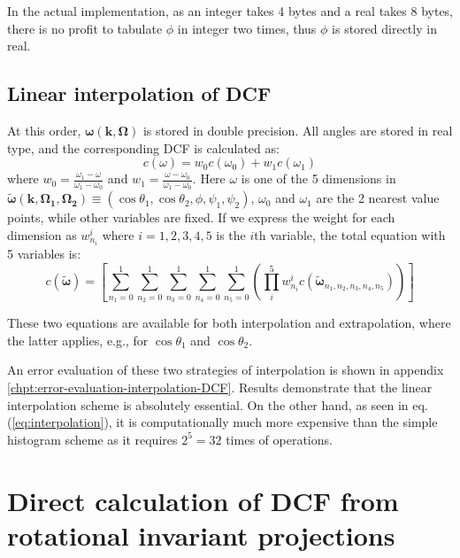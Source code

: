 In the actual implementation, as an integer takes 4 bytes and a real 
takes 8 bytes, there is no profit to tabulate $\phi$ in integer two
times, thus $\phi$ is stored directly in real.


\subsection{Linear interpolation of DCF\label{sub:Linear-interpolation-of}}

At this order, $\boldsymbol{\omega}(\mathbf{k},\mathbf{\Omega})$
is stored in double precision. All angles are stored in real type,
and the corresponding DCF is calculated as:
\begin{equation}
c(\omega)=w_{0}c(\omega_{0})+w_{1}c(\omega_{1})
\end{equation}
where $w_{0}=\frac{\omega_{1}-\omega}{\omega_{1}-\omega_{0}}$ and
$w_{1}=\frac{\omega-\omega_{0}}{\omega_{1}-\omega_{0}}$. Here $\omega$
is one of the 5 dimensions in $\tilde{\boldsymbol{\omega}}(\mathbf{k},\mathbf{\Omega_{1}},\mathbf{\Omega_{2}})\equiv(\cos\theta_{1},\cos\theta_{2},\phi,\psi_{1},\psi_{2})$,
$\omega_{0}$ and $\omega_{1}$ are the 2 nearest value points, while
other variables are fixed. If we express the weight for each dimension
as $w_{n_{i}}^{i}$ where $i=1,2,3,4,5$ is the $i$th variable, the
total equation with 5 variables is:
\begin{equation}
c(\tilde{\boldsymbol{\omega}})=\left[\sum_{n_{1}=0}^{1}\sum_{n_{2}=0}^{1}\sum_{n_{3}=0}^{1}\sum_{n_{4}=0}^{1}\sum_{n_{5}=0}^{1}\left(\prod_{i}^{5}w_{n_{i}}^{i}c(\tilde{\boldsymbol{\omega}}_{n_{1},n_{2},n_{3},n_{4},n_{5}})\right)\right]\label{eq:interpolation}
\end{equation}


These two equations are available for both interpolation and extrapolation,
where the latter applies, e.g., for $\cos\theta_{1}$ and $\cos\theta_{2}$. 

An error evaluation of these two strategies of interpolation is shown
in appendix \ref{chpt:error-evaluation-interpolation-DCF}. Results
demonstrate that the linear interpolation scheme is absolutely essential. On
the other hand, as seen in eq. (\ref{eq:interpolation}), it is computationally
much more expensive than the simple histogram scheme as it requires
$2^{5}=32$ times of operations.


\section{Direct calculation of DCF from rotational invariant projections}

